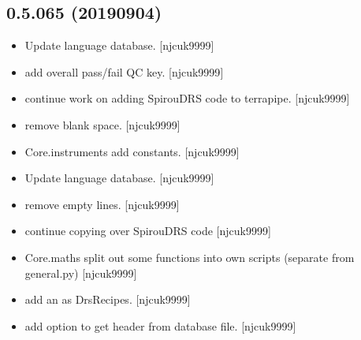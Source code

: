 \documentclass[a4paper,10pt,english]{report}
\begin{document}
\subsection{0.5.065 (2019\sphinxhyphen{}09\sphinxhyphen{}04)}
\label{\detokenize{misc/changelog:id96}}\begin{itemize}
\item {} 
Update language database. {[}njcuk9999{]}

\item {} 
 \sphinxhyphen{} add overall pass/fail QC key. {[}njcuk9999{]}

\item {} 
 \sphinxhyphen{} continue work on adding SpirouDRS code to terrapipe.
{[}njcuk9999{]}

\item {} 
 \sphinxhyphen{} remove blank space. {[}njcuk9999{]}

\item {} 
Core.instruments \sphinxhyphen{} add  constants. {[}njcuk9999{]}

\item {} 
Update language database. {[}njcuk9999{]}

\item {} 
 \sphinxhyphen{} remove empty lines. {[}njcuk9999{]}

\item {} 
 \sphinxhyphen{} continue copying over SpirouDRS code
 {[}njcuk9999{]}

\item {} 
Core.maths \sphinxhyphen{} split out some functions into own scripts (separate from
general.py) {[}njcuk9999{]}

\item {} 
 \sphinxhyphen{} add  an  as
DrsRecipes. {[}njcuk9999{]}

\item {} 
 \sphinxhyphen{} add option to get header from database
file. {[}njcuk9999{]}

\end{itemize}
\end{document}

